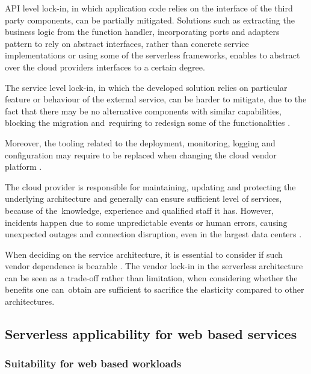 API level lock-in, in which application code relies on the interface of the third party components, can be partially mitigated.
Solutions such as extracting the business logic from the function handler, incorporating ports and adapters pattern to rely on abstract interfaces, rather than concrete service implementations or using some of the serverless frameworks, enables to abstract over the cloud providers interfaces to a certain degree.

The service level lock-in, in which the developed solution relies on particular feature or behaviour of the external service, can be harder to mitigate, due to the fact that there may be no alternative components with similar capabilities, blocking the migration and~requiring to redesign some of the functionalities \cite{EvaluationOfServerlessApplicationProgrammingModel}.

Moreover, the tooling related to the deployment, monitoring, logging and configuration may require to be replaced when changing the cloud vendor platform \cite{MartinFowlerServerless}.

The cloud provider is responsible for maintaining, updating and protecting the underlying architecture and generally can ensure sufficient level of services, because of the~knowledge, experience and qualified staff it has. However, incidents happen due to some unpredictable events or human errors, causing unexpected outages and connection disruption, even in the largest data centers \cite{EvaluationOfServerlessApplicationProgrammingModel}.

When deciding on the service architecture, it is essential to consider if such vendor dependence is bearable \cite{LeveragingServerlessCloudComputingArchitectures}.
The vendor lock-in in the serverless architecture can be seen as a trade-off rather than limitation, when considering whether the benefits one can~obtain are sufficient to sacrifice the elasticity compared to other architectures.

\subsection{Serverless applicability for web based services}

\subsubsection{Suitability for web based workloads} \label{chapter:serverless-suitability-for-web-based-workloads}


